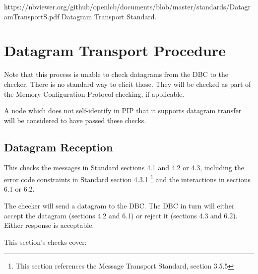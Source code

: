 



\maketitle
\thispagestyle{firststyle}

\introductionCaveats
{https://nbviewer.org/github/openlcb/documents/blob/master/standards/DatagramTransportS.pdf}
{Datagram Transport Standard}.

\section{Datagram Transport Procedure}


Note that this process is unable to check datagrams from the DBC to the checker.
There is no standard way to elicit those.  They will be checked as part of the 
Memory Configuration Protocol checking, if applicable.

A node which does not self-identify in PIP that it supports
datagram transfer will be considered to have passed these checks.
\pipsetFootnote

\subsection{Datagram Reception}

This checks the messages in Standard sections 4.1 and 4.2 or 4.3, 
including the error code constraints in Standard section 4.3.1
\footnote{This section references the Message Transport Standard, 
section 3.5.5}
and the interactions in sections 6.1 or 6.2.

The checker will send a datagram to the DBC. The DBC in turn will 
either accept the datagram (sections 4.2 and 6.1) or 
reject it (sections 4.3 and 6.2). Either response is acceptable.

This section's checks cover:

